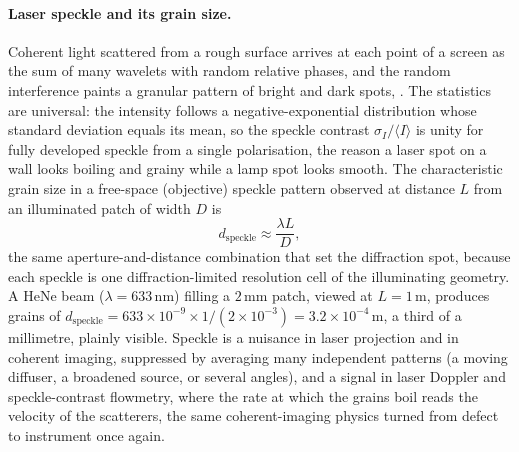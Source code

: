 \paragraph{Laser speckle and its grain size.} Coherent light scattered from a
rough surface arrives at each point of a screen as the sum of many wavelets with
random relative phases, and the random interference paints a granular pattern of
bright and dark spots, . The statistics are universal: the
intensity follows a negative-exponential distribution whose standard deviation
equals its mean, so the speckle contrast $\sigma_I/\langle I\rangle$ is unity for
fully developed speckle from a single polarisation, the reason a laser spot on a
wall looks boiling and grainy while a lamp spot looks smooth. The characteristic
grain size in a free-space (objective) speckle pattern observed at distance $L$
from an illuminated patch of width $D$ is
\[
d_{\text{speckle}} \approx \frac{\lambda L}{D},
\]
the same aperture-and-distance combination that set the diffraction spot, because
each speckle is one diffraction-limited resolution cell of the illuminating
geometry. A HeNe beam ($\lambda = 633\,\si{\nano\meter}$) filling a
$2\,\si{\milli\meter}$ patch, viewed at $L = 1\,\si{\meter}$, produces grains of
$d_{\text{speckle}} = 633\times 10^{-9}\times 1/(2\times 10^{-3}) =
3.2\times 10^{-4}\,\si{\meter}$, a third of a millimetre, plainly visible.
Speckle is a nuisance in laser projection and in coherent imaging, suppressed by
averaging many independent patterns (a moving diffuser, a broadened source, or
several angles), and a signal in laser Doppler and speckle-contrast flowmetry,
where the rate at which the grains boil reads the velocity of the scatterers, the
same coherent-imaging physics turned from defect to instrument once again.

